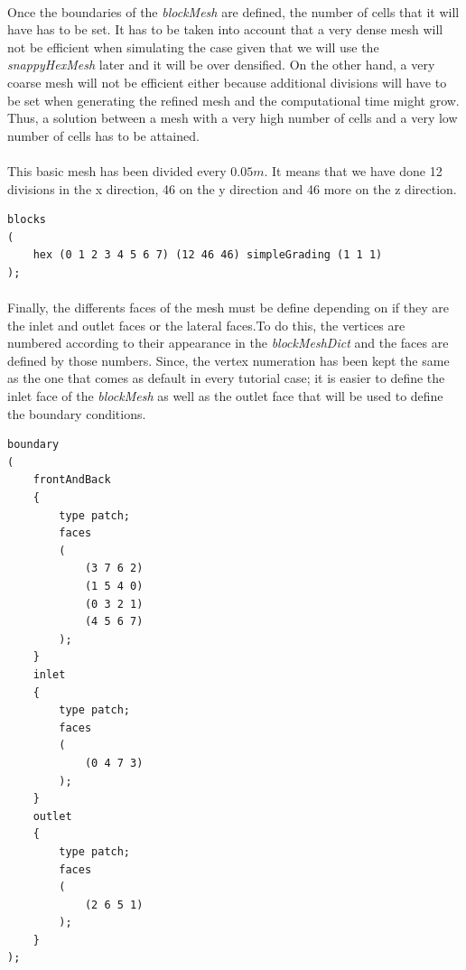 \paragraph{}Once the boundaries of the \textit{blockMesh} are defined, the number of cells that it will have has to be set. It has to be taken into account that a very dense mesh will not be efficient when simulating the case given that we will use the \textit{snappyHexMesh} later and it will be over densified. On the other hand, a very coarse mesh will not be efficient either because additional divisions will have to be set when generating the refined mesh and the computational time might grow. Thus, a solution between a mesh with a very high number of cells and a very low number of cells has to be attained.

\paragraph{}This basic mesh has been divided every $0.05m$. It means that we have done 12 divisions in the x direction, 46 on the y direction and 46 more on the z direction. 

\begin{footnotesize}
\begin{verbatim}
blocks
(
    hex (0 1 2 3 4 5 6 7) (12 46 46) simpleGrading (1 1 1)
);
\end{verbatim}
\end{footnotesize}

\paragraph{}Finally, the differents faces of the mesh must be define depending on if they are the inlet and outlet faces or the lateral faces.To do this, the vertices are numbered according to their appearance in the \textit{blockMeshDict} and the faces are defined by those numbers. Since, the vertex numeration has been kept the same as the one that comes as default in every tutorial case; it is easier to define the inlet face of the \textit{blockMesh} as well as the outlet face that will be used to define the boundary conditions.

\begin{footnotesize}
\begin{verbatim}
boundary
(
    frontAndBack
    {
        type patch;
        faces
        (
            (3 7 6 2)
            (1 5 4 0)
            (0 3 2 1)
            (4 5 6 7)
        );
    }
    inlet
    {
        type patch;
        faces
        (
            (0 4 7 3)
        );
    }
    outlet
    {
        type patch;
        faces
        (
            (2 6 5 1)
        );
    }
);
\end{verbatim}
\end{footnotesize}

